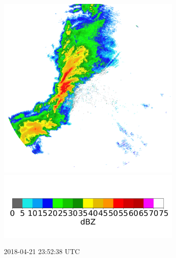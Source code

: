 \begin{figure}[h]
\begin{subfigure}[b]{0.3\textwidth}
		\includegraphics[width=\textwidth]{./thesis_code/plots/midlothian.tx-20180421-235238-ref.png}
		\includegraphics[width=\textwidth]{./thesis_code/plots/dfw_colormap.png}
		\caption{2018-04-21 23:52:38 UTC}
		\label{fig:bestmodel_translation3}
	\end{subfigure}
	\\
	\begin{subfigure}[b]{0.3\textwidth}

\end{subfigure}
\end{figure}
